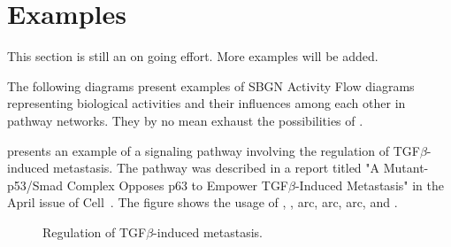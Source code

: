 
\chapter{Examples}

\color{red}
This section is still an on going effort.  More examples will be added.
\normalcolor


The following diagrams present examples of SBGN Activity Flow diagrams representing biological activities and their influences among each other in pathway networks.  They by no mean exhaust the possibilities of \SBGNAFLone.

 presents an example of a signaling pathway involving the regulation of TGF$\beta$-induced metastasis.  The pathway was described in a report titled "A Mutant-p53/Smad Complex Opposes p63 to Empower TGF$\beta$-Induced Metastasis" in the April issue of Cell~\cite{Adorno:2009}.  The figure shows the usage of , ,  arc,  arc,  arc, and .

\begin{figure}
\begin{center}
\caption{Regulation of TGF$\beta$-induced metastasis.}\label{fig:TGF}
\end{center}
\end{figure}

